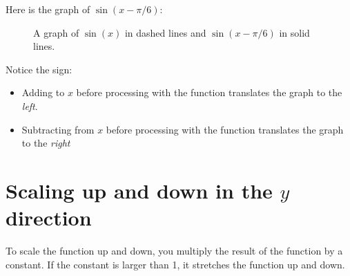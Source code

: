 Here is the graph of $\sin(x - \pi/6)$:
\begin{figure}[htbp]
    \centering
        
    \caption{A graph of $\sin(x)$ in dashed lines and $\sin(x-\pi/6)$ in solid lines.}
    \label{fig:translationRight}
\end{figure}

Notice the sign:
\begin{itemize}
\item Adding to $x$ before processing with the function translates the graph to the \emph{left}.
\item Subtracting from $x$ before processing with the function translates the graph to the \emph{right}
\end{itemize}

\section{Scaling up and down in the $y$ direction}

To scale the function up and down, you multiply the result of the
function by a constant.  If the constant is larger than 1, it
stretches the function up and down.

